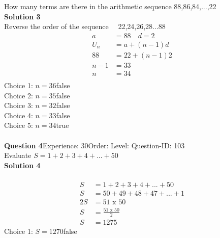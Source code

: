 \documentclass{article}
\begin{document}
How many terms are there in the arithmetic sequence 88,86,84,...,22\\[4pt]
\noindent\textbf{Solution 3}\\[2pt]
Reverse the order of the sequence$\quad$ 22,24,26,28...88
\begin{align*}
a&=88 \quad d=2\\[2pt]
U_n&=a+(n-1)d\\[2pt]
88&=22+(n-1)2\\[2pt]
n-1&=33\\[2pt]
n&=34\\[-100pt]
\end{align*}
Choice 1: \hspace{20pt}$n=36$\hspace{20pt}false\\
Choice 2: \hspace{20pt}$n=35$\hspace{20pt}false\\
Choice 3: \hspace{20pt}$n=32$\hspace{20pt}false\\
Choice 4: \hspace{20pt}$n=33$\hspace{20pt}false\\
Choice 5: \hspace{20pt}$n=34$\hspace{20pt}true\\
\\[4pt]
\noindent\textbf{Question 4}\hspace{20pt}Experience: 30\hspace{20pt}Order: \hspace{20pt}Level: \hspace{20pt}Question-ID: 103\\[2pt]
Evaluate $S=1+2+3+4+...+50$\\[4pt]
\noindent\textbf{Solution 4}\\[2pt]
\\[-35pt]\begin{align*}
S&=1+2+3+4+...+50\\[2pt]
S&=50+49+48+47+...+1\\[2pt]
2S&=51\,\,\text{x}\,\,50\\[2pt]
S&=\displaystyle\frac{51\,\,\text{x}\,\,50}{2}\\[2pt]
S&=1275
\end{align*}
Choice 1: \hspace{20pt}$S=1270$\hspace{20pt}false\\
\end{document}
